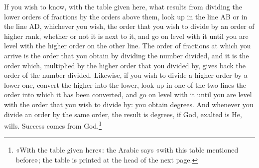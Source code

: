 \documentclass[11pt]{article}
\newcommand{\ArPage}[1]{\marginpar{\footnotesize\color{gray}Ar.\,p.\,#1}}
\begin{document}
\par \ArPage{12}If you wish to know, with the table given here, what results from dividing the lower orders of fractions by the orders above them, look up in the line AB or in the line AD, whichever you wish, the order that you wish to divide by an order of higher rank, whether or not it is next to it, and go on level with it until you are level with the higher order on the other line. The order of fractions at which you arrive is the order that you obtain by dividing the number divided, and it is the order which, multiplied by the higher order that you divided by, gives back the order of the number divided. Likewise, if you wish to divide a higher order by a lower one, convert the higher into the lower, look up in one of the two lines the order into which it has been converted, and go on level with it until you are level with the order that you wish to divide by: you obtain degrees. And whenever you divide an order by the same order, the result is degrees, if God, exalted is He, wills. Success comes from God.\footnote{«With the table given here»: the Arabic says «with this table mentioned before»; the table is printed at the head of the next page.}\par
\end{document}

